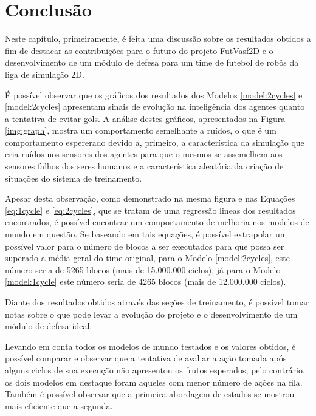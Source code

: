 \chapter{Conclusão}\label{sec:conclusion}

Neste capítulo, primeiramente, é feita uma discussão sobre os resultados obtidos
a fim de destacar as contribuições para o futuro do projeto FutVasf2D e o desenvolvimento
de um módulo de defesa para um time de futebol de robôs da liga de simulação 2D.

É possível observar que os gráficos dos resultados dos Modelos
\ref{model:2cycles} e \ref{model:2cycles} apresentam sinais de evolução na
inteligência dos agentes quanto a tentativa de evitar gols. A análise destes
gráficos, apresentados na Figura \ref{img:graph}, mostra um comportamento
semelhante a ruídos, o que é um comportamento espererado devido a, primeiro, a
característica da simulação que cria ruídos nos sensores dos agentes para que o
mesmos se assemelhem aos sensores falhos dos seres humanos e a característica
aleatória da criação de situações do sistema de treinamento.

Apesar desta observação, como demonstrado na mesma figura e nas Equações
\ref{eq:1cycle} e \ref{eq:2cycles}, que se tratam de uma regressão lineas dos
resultados encontrados, é possível encontrar um comportamento de melhoria nos
modelos de mundo em questão. Se baseando em tais equações, é possível extrapolar
um possível valor para o número de blocos a ser executados para que possa ser
superado a média geral do time original, para o Modelo \ref{model:2cycles}, este
número seria de 5265 blocos (mais de 15.000.000 ciclos), já para o Modelo
\ref{model:1cycle} este número seria de 4265 blocos (mais de 12.000.000 ciclos).

Diante dos resultados obtidos através das seções de treinamento, é possível
tomar notas sobre o que pode levar a evolução do projeto e o desenvolvimento de
um módulo de defesa ideal.

Levando em conta todos os modelos de mundo testados e os valores obtidos, é possível
comparar e observar que a tentativa de avaliar a ação tomada após alguns ciclos
de sua execução não apresentou os frutos esperados, pelo contrário, os dois
modelos em destaque foram aqueles com menor número de ações na fila. Também é
possível observar que a primeira abordagem de estados se mostrou mais
eficiente que a segunda.

